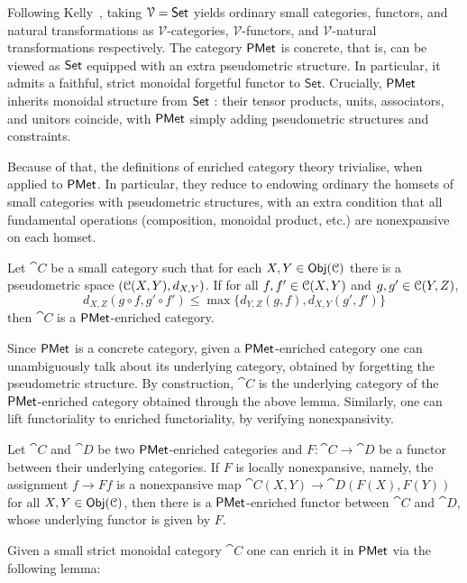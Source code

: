Following Kelly~\cite{Kelly:1982:Basic}, taking $\mathcal{V} = {\mathsf{Set}}$ yields ordinary small categories, functors, and natural transformations as $\mathcal{V}$-categories, $\mathcal{V}$-functors, and $\mathcal{V}$-natural transformations respectively. The category $\mathsf{PMet}$ is concrete, that is, can be viewed as ${\mathsf{Set}}$ equipped with an extra pseudometric structure. In particular, it admits a faithful, strict monoidal forgetful functor to $\mathsf{Set}$. Crucially, $\mathsf{PMet}$ inherits monoidal structure from  ${\mathsf{Set}}$ : their tensor products, units, associators, and unitors coincide, with $\mathsf{PMet}$ simply adding pseudometric structures and constraints.

Because of that, the definitions of enriched category theory trivialise, when applied to $\mathsf{PMet}$. In particular, they reduce to endowing ordinary the homsets of small categories with pseudometric structures, with an extra condition that all fundamental operations (composition, monoidal product, etc.) are nonexpansive on each homset.
	\begin{lemma}\label{lem:enriched_cat}
		Let $\cat{C}$ be a small category such that for each $X,Y \in \mathsf{Obj}(\mathcal{C})$ there is a pseudometric space $(\mathcal{C}(X,Y),d_{X,Y})$. If for all $f,f' \in \mathcal{C}(X,Y)$ and $g,g' \in \mathcal{C}(Y,Z)$,
		$$
			d_{X,Z}(g \circ f, g' \circ f') \leq \max \{
			d_{Y,Z}(g,f),  d_{X,Y}(g',f')\}
		$$
		then $\cat{C}$ is a $\mathsf{PMet}$-enriched category. 
	\end{lemma}
	Since $\mathsf{PMet}$ is a concrete category, given a $\mathsf{PMet}$-enriched category one can unambiguously talk about its underlying category, obtained by forgetting the pseudometric structure. By construction, $\cat{C}$ is the underlying category of the $\mathsf{PMet}$-enriched category obtained through the above lemma. Similarly, one can lift functoriality to enriched functoriality, by verifying nonexpansivity.
	\begin{lemma}\label{lem:enriched_fun}
		Let $\cat{C}$ and $\cat{D}$ be two $\mathsf{PMet}$-enriched categories and $F \colon \cat{C} \to \cat{D}$ be a functor between
their underlying categories. If $F$ is locally nonexpansive, namely, the assignment $f \to Ff$ is a nonexpansive map $\cat{C}(X,Y) \to \cat{D} (F(X),F(Y))$ for all $X,Y \in \mathsf{Obj}(\mathcal{C})$, then there is a $\mathsf{PMet}$-enriched functor between $\cat{C}$ and $\cat{D}$, whose underlying functor is given by $F$.
	\end{lemma}
	Given a small strict monoidal category $\cat{C}$ one can enrich it in $\mathsf{PMet}$ via the following lemma:

